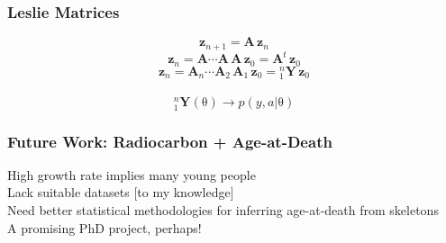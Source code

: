\documentclass{beamer}
\newcommand{\greekbf}[1]{\boldsymbol{\mathrm{#1}}}
\begin{document}
\begin{frame}[t]
  \frametitle{Leslie Matrices}
\begin{minipage}{0\linewidth}
\begin{flushleft}                           
\begin{equation*}
      \mathbf{z}_{n+1} = \mathbf{A} \, \mathbf{z}_{n}
\end{equation*}
\pause
\begin{equation*}
	\mathbf{z}_{n} = \mathbf{A} \cdots \mathbf{A} \, \mathbf{A} \, \mathbf{z}_{0} = \mathbf{A}^t \, \mathbf{z}_{0}
\end{equation*}
\pause
\begin{equation*}
	\mathbf{z}_{n} = \mathbf{A}_n \cdots \mathbf{A}_2 \, \mathbf{A}_1 \, \mathbf{z}_{0} = {}^n_1\mathbf{Y} \, \mathbf{z}_{0}
\end{equation*}
\pause
\\
\begin{equation*}
	{}^n_1\mathbf{Y}(\greekbf{\theta}) \longrightarrow p(y,a|\greekbf{\theta})
\end{equation*}
\end{flushleft} 
\end{minipage}
\end{frame}

\begin{frame}[t]
  \frametitle{Future Work: Radiocarbon + Age-at-Death}
    \large High growth rate implies many young people \normalsize\\
    \pause
    \bigskip
    \large Lack suitable datasets [to my knowledge]\\
    \pause
    \bigskip
    \large Need better statistical methodologies for inferring age-at-death from skeletons\\
    \pause
    \bigskip
    \large A promising PhD project, perhaps!\\
\end{frame}
\end{document}
